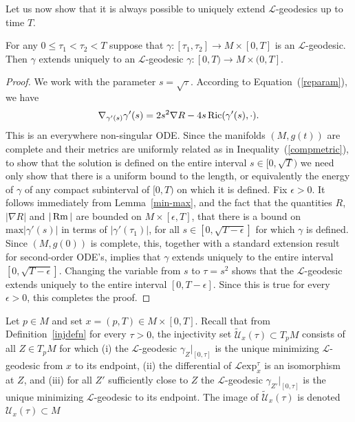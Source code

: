 Let us now show that it is always possible to uniquely extend
${\mathcal L}$-geodesics up to time $T$.

\begin{lemma}
\label{lem:l-geodesic-extension}
 For any $0\le \tau_1<\tau_2<T$ suppose that
 $\gamma\colon [\tau_1,\tau_2]\to M\times [0,T]$ is an ${\mathcal L}$-geodesic.
 Then $\gamma$ extends uniquely to an ${\mathcal L}$-geodesic
$\gamma\colon [0,T)\to M\times (0,T]$.
\end{lemma}


\begin{proof}\sketch
We work with the parameter $s=\sqrt{\tau}$. According to
Equation~(\ref{reparam}), we have
$$\nabla_{\gamma'(s)}\gamma'(s)=2s^2\nabla
R-4s\operatorname{Ric}(\gamma'(s),\cdot).$$ This is an everywhere
non-singular ODE. Since the manifolds $(M,g(t))$ are complete and
their metrics are uniformly related as in
Inequality~(\ref{compmetric}), to show that the solution is defined
on the entire interval $s\in [0,\sqrt{T})$ we need only show that
there is a uniform bound to the length, or equivalently the energy
of $\gamma$ of any compact subinterval of $[0,T)$ on which it is
defined. Fix $\epsilon>0$. It follows immediately from
Lemma~\ref{min-max}, and the fact that the quantities $R$, $|\nabla
R|$ and $|\operatorname{Rm}|$ are bounded on $M\times [\epsilon,T]$, that
there is a bound on $\mathrm{max}|\gamma'(s)|$ in terms of
$|\gamma'(\tau_1)|$, for all $s\in [0,\sqrt{T-\epsilon}]$ for which
$\gamma$ is defined. Since $(M,g(0))$ is complete, this, together
with a standard extension result for second-order ODE's, implies
that $\gamma$ extends uniquely to the entire interval
$[0,\sqrt{T-\epsilon}]$. Changing the variable from $s$ to
$\tau=s^2$ shows that the ${\mathcal L}$-geodesic extends uniquely
to the entire interval $[0,T-\epsilon]$. Since this is true for
every $\epsilon>0$, this completes the proof.
\end{proof}

Let $p\in M$ and set $x=(p,T)\in M\times [0,T]$. Recall that from
Definition~\ref{injdefn} for every $\tau>0$, the injectivity set
$\widetilde{\mathcal U}_{x}(\tau)\subset T_pM$ consists of all $Z\in
T_pM$ for which (i) the ${\mathcal L}$-geodesic
$\gamma_Z|_{[0,\tau]}$ is the unique minimizing ${\mathcal
L}$-geodesic from $x$ to its endpoint, (ii) the differential of
${\mathcal L}\mathrm{exp}_{x}^\tau$ is an isomorphism at $Z$, and (iii)
for all  $Z'$ sufficiently close to
 $Z$ the ${\mathcal L}$-geodesic $\gamma_{Z'}|_{[0,\tau]}$ is the unique minimizing
 ${\mathcal L}$-geodesic to its endpoint. The image
of $\widetilde{\mathcal U}_{x}(\tau)$ is denoted ${\mathcal U}_{x}(\tau)\subset
M$




